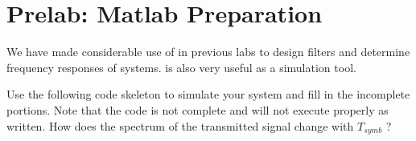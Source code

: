 \section{Prelab: Matlab Preparation}
We have made considerable use of \matlab in previous labs to
design filters and determine frequency responses of systems.
\matlab is also very useful as a simulation tool.

Use the following \matlab code skeleton to simulate your system
and fill in the incomplete portions.  Note that the code is not
complete and will not execute properly as written.  How does the
spectrum of the transmitted signal change with $T_{symb}$ ?

\setlength{\baselineskip}{0.39cm}
\setlength{\parskip}{0.4cm}
\setlength{\baselineskip}{0.5cm}
\setlength{\parskip}{0.5cm}

